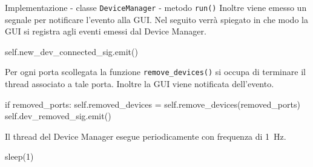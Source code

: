 
\begin{frame}[fragile, shrink=10]{Implementazione - classe \lstinline!DeviceManager! - metodo \lstinline!run()!}
  Inoltre viene emesso un \alert{segnale} per notificare l'evento alla GUI. Nel seguito verrà
  spiegato in che modo la GUI si registra agli eventi emessi dal Device Manager.

  \begin{Python}
                self.new_dev_connected_sig.emit()
  \end{Python}
  Per ogni porta scollegata la funzione \lstinline!remove_devices()! si occupa di 
  terminare il thread associato a tale porta. Inoltre la GUI viene notificata dell'evento.
  \begin{Python}
            if removed_ports:
                self.removed_devices = self.remove_devices(removed_ports)
                self.dev_removed_sig.emit()
  \end{Python}
  Il thread del Device Manager esegue periodicamente con frequenza di \SI{1}{\hertz}.
  \begin{Python}
            sleep(1)
  \end{Python}
  
\end{frame}

